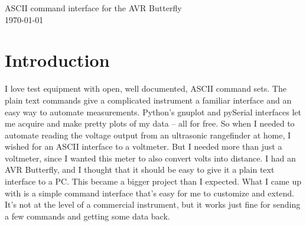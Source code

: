 
\graphicspath{
              {figs/} %
              {pngs/} %
}

\newcommand{\isdraft}{1} %
\doublespacing{} %






\begin{center}
	{\huge ASCII command interface for the AVR Butterfly}\\
	\today
\end{center}



\section{Introduction}
I love test equipment with open, well documented, ASCII command sets.  The plain text commands give a complicated instrument a familiar interface and an easy way to automate measurements.  Python's gnuplot and pySerial interfaces let me acquire and make pretty plots of my data -- all for free\cite{pyserial,gnuplot-py}. So when I needed to automate reading the voltage output from an ultrasonic rangefinder at home, I wished for an ASCII interface to a voltmeter.  But I needed more than just a voltmeter, since I wanted this meter to also convert volts into distance.  I had an AVR Butterfly, and I thought that it should be easy to give it a plain text interface to a PC.  This became a bigger project than I expected.  What I came up with is a simple command interface that's easy for me to customize and extend.  It's not at the level of a commercial instrument, but it works just fine for sending a few commands and getting some data back.

\clearpage
